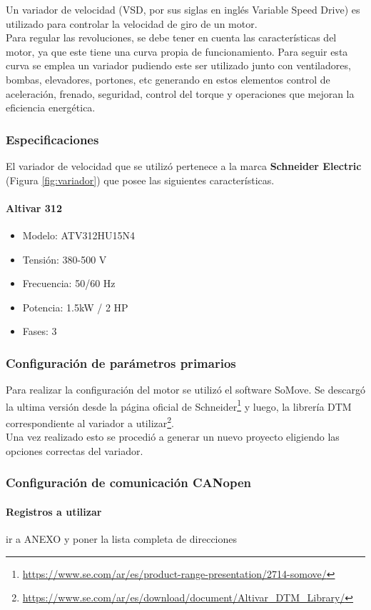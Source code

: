 \begin{tcolorbox}[colback=blue!5!white,colframe=blue!75!black,title=Definición]
Un variador de velocidad (VSD, por sus siglas en inglés Variable Speed Drive) es utilizado para controlar la velocidad de giro de un motor. \\
Para regular las revoluciones, se debe tener en cuenta las características del motor, ya que este tiene una curva propia de funcionamiento. Para seguir esta curva se emplea un variador pudiendo este ser utilizado junto con ventiladores, bombas, elevadores, portones, etc generando en estos elementos control de aceleración, frenado, seguridad, control del torque y operaciones que mejoran la eficiencia energética.
\end{tcolorbox}

\subsubsection{Especificaciones}
El variador de velocidad que se utilizó pertenece a la marca \textbf{Schneider Electric} (Figura \ref{fig:variador}) que posee las siguientes características. \\
	\paragraph*{Altivar 312}
\begin{minipage}[t]{.5\textwidth}
	\begin{itemize}
		\item 	Modelo: ATV312HU15N4
		\item   Tensión: 380-500 V
		\item 	Frecuencia: 50/60 Hz
		\item 	Potencia: 1.5kW / 2 HP
		\item 	Fases: 3
	\end{itemize}
\end{minipage}	
\begin{minipage}[t]{.5\textwidth}
	\centering{}
	\label{fig:variador}
\end{minipage}


	\subsubsection{Configuración de parámetros primarios}
	Para realizar la configuración del motor se utilizó el software SoMove. Se descargó la ultima versión desde la página oficial de Schneider\footnote{\url{https://www.se.com/ar/es/product-range-presentation/2714-somove/}} y luego, la librería DTM correspondiente al variador a utilizar\footnote{\url{https://www.se.com/ar/es/download/document/Altivar_DTM_Library/}}. 
	\\
	Una vez realizado esto se procedió a generar un nuevo proyecto eligiendo las opciones correctas del variador.
	
	\subsubsection{Configuración de comunicación CANopen}

	\paragraph{Registros a utilizar}
	ir a ANEXO y poner la lista completa de direcciones

	\newpage


